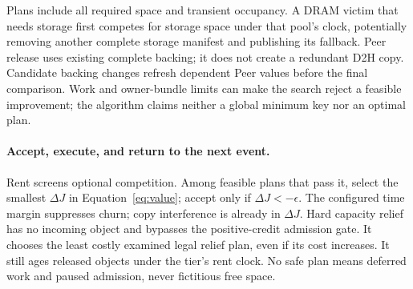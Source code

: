 Plans include all required space and transient occupancy. A DRAM victim
that needs storage first competes for storage space under that pool's
clock, potentially removing another complete storage manifest and
publishing its fallback. Peer release uses existing complete backing;
it does not create a redundant D2H copy. Candidate backing changes
refresh dependent Peer values before the final comparison. Work and
owner-bundle limits can make the search reject a feasible improvement;
the algorithm claims neither a global minimum key nor an optimal plan.

\paragraph{Accept, execute, and return to the next event.}
Rent screens optional competition. Among feasible plans that pass it,
select the smallest $\Delta J$ in Equation~\ref{eq:value}; accept only
if $\Delta J<-\epsilon$. The configured time margin suppresses churn;
copy interference is already in $\Delta J$. Hard capacity relief has no
incoming object and bypasses the positive-credit admission gate. It
chooses the least costly examined legal relief plan, even if its cost
increases. It still ages released objects under the tier's rent clock.
No safe plan means deferred work and paused admission, never fictitious
free space.


